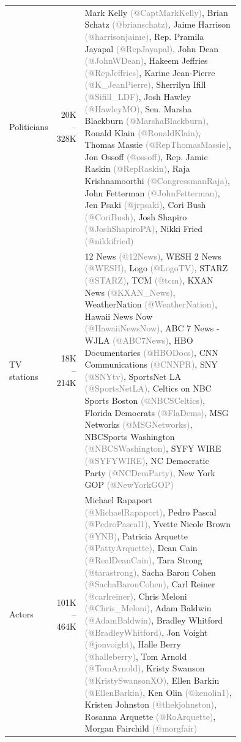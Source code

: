 \begin{tabular}{lrp{0.75\linewidth}}
Politicians & 20K -- 328K & Mark Kelly {\textcolor{gray}{(@CaptMarkKelly)}}, Brian Schatz {\textcolor{gray}{(@brianschatz)}}, Jaime Harrison {\textcolor{gray}{(@harrisonjaime)}}, Rep. Pramila Jayapal {\textcolor{gray}{(@RepJayapal)}}, John Dean {\textcolor{gray}{(@JohnWDean)}}, Hakeem Jeffries {\textcolor{gray}{(@RepJeffries)}}, Karine Jean-Pierre {\textcolor{gray}{(@K\_JeanPierre)}}, Sherrilyn Ifill {\textcolor{gray}{(@Sifill\_LDF)}}, Josh Hawley {\textcolor{gray}{(@HawleyMO)}}, Sen. Marsha Blackburn {\textcolor{gray}{(@MarshaBlackburn)}}, Ronald Klain {\textcolor{gray}{(@RonaldKlain)}}, Thomas Massie {\textcolor{gray}{(@RepThomasMassie)}}, Jon Ossoff {\textcolor{gray}{(@ossoff)}}, Rep. Jamie Raskin {\textcolor{gray}{(@RepRaskin)}}, Raja Krishnamoorthi {\textcolor{gray}{(@CongressmanRaja)}}, John Fetterman {\textcolor{gray}{(@JohnFetterman)}}, Jen Psaki {\textcolor{gray}{(@jrpsaki)}}, Cori Bush {\textcolor{gray}{(@CoriBush)}}, Josh Shapiro {\textcolor{gray}{(@JoshShapiroPA)}}, Nikki Fried {\textcolor{gray}{(@nikkifried)}} \\
TV stations & 18K -- 214K & 12 News {\textcolor{gray}{(@12News)}}, WESH 2 News {\textcolor{gray}{(@WESH)}}, Logo {\textcolor{gray}{(@LogoTV)}}, STARZ {\textcolor{gray}{(@STARZ)}}, TCM {\textcolor{gray}{(@tcm)}}, KXAN News {\textcolor{gray}{(@KXAN\_News)}}, WeatherNation {\textcolor{gray}{(@WeatherNation)}}, Hawaii News Now {\textcolor{gray}{(@HawaiiNewsNow)}}, ABC 7 News - WJLA {\textcolor{gray}{(@ABC7News)}}, HBO Documentaries {\textcolor{gray}{(@HBODocs)}}, CNN Communications {\textcolor{gray}{(@CNNPR)}}, SNY {\textcolor{gray}{(@SNYtv)}}, SportsNet LA {\textcolor{gray}{(@SportsNetLA)}}, Celtics on NBC Sports Boston {\textcolor{gray}{(@NBCSCeltics)}}, Florida Democrats {\textcolor{gray}{(@FlaDems)}}, MSG Networks {\textcolor{gray}{(@MSGNetworks)}}, NBCSports Washington {\textcolor{gray}{(@NBCSWashington)}}, SYFY WIRE {\textcolor{gray}{(@SYFYWIRE)}}, NC Democratic Party {\textcolor{gray}{(@NCDemParty)}}, New York GOP {\textcolor{gray}{(@NewYorkGOP)}} \\
Actors & 101K -- 464K & Michael Rapaport {\textcolor{gray}{(@MichaelRapaport)}}, Pedro Pascal {\textcolor{gray}{(@PedroPascal1)}}, Yvette Nicole Brown {\textcolor{gray}{(@YNB)}}, Patricia Arquette {\textcolor{gray}{(@PattyArquette)}}, Dean Cain {\textcolor{gray}{(@RealDeanCain)}}, Tara Strong {\textcolor{gray}{(@tarastrong)}}, Sacha Baron Cohen {\textcolor{gray}{(@SachaBaronCohen)}}, Carl Reiner {\textcolor{gray}{(@carlreiner)}}, Chris Meloni {\textcolor{gray}{(@Chris\_Meloni)}}, Adam Baldwin {\textcolor{gray}{(@AdamBaldwin)}}, Bradley Whitford {\textcolor{gray}{(@BradleyWhitford)}}, Jon Voight {\textcolor{gray}{(@jonvoight)}}, Halle Berry {\textcolor{gray}{(@halleberry)}}, Tom Arnold {\textcolor{gray}{(@TomArnold)}}, Kristy Swanson {\textcolor{gray}{(@KristySwansonXO)}}, Ellen Barkin {\textcolor{gray}{(@EllenBarkin)}}, Ken Olin {\textcolor{gray}{(@kenolin1)}}, Kristen Johnston {\textcolor{gray}{(@thekjohnston)}}, Rosanna Arquette {\textcolor{gray}{(@RoArquette)}}, Morgan Fairchild {\textcolor{gray}{(@morgfair)}} \\

\end{tabular}
